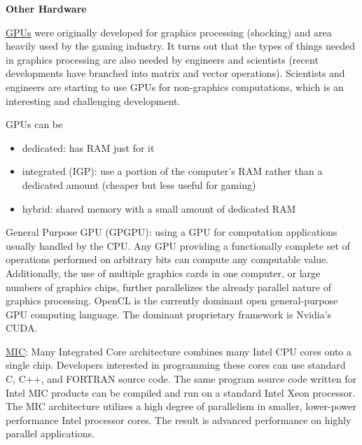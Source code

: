 \documentclass[12pt]{article}
\begin{document}
\vspace*{2em}
\noindent \textbf{Other Hardware}

\underline{GPUs} were originally developed for graphics processing (shocking) and area heavily used by the gaming industry. It turns out that the types of things needed in graphics processing are also needed by engineers and scientists (recent developments have branched into matrix and vector operations). Scientists and engineers are starting to use GPUs for non-graphics computations, which is an interesting and challenging development. 

GPUs can be 
\begin{itemize}
\item dedicated: has RAM just for it
\item integrated (IGP): use a portion of the computer's RAM rather than a dedicated amount (cheaper but less useful for gaming)
\item hybrid: shared memory with a small amount of dedicated RAM
\end{itemize}

General Purpose GPU (GPGPU): using a GPU for computation applications usually handled by the CPU. Any GPU providing a functionally complete set of operations performed on arbitrary bits can compute any computable value. Additionally, the use of multiple graphics cards in one computer, or large numbers of graphics chips, further parallelizes the already parallel nature of graphics processing. OpenCL is the currently dominant open general-purpose GPU computing language. The dominant proprietary framework is Nvidia's CUDA.

\vspace*{1em}
\underline{MIC}: Many Integrated Core architecture  combines many Intel CPU cores onto a single chip. Developers interested in programming these cores can use standard C, C++, and FORTRAN source code. The same program source code written for Intel MIC products can be compiled and run on a standard Intel Xeon processor. The MIC architecture utilizes a high degree of parallelism in smaller, lower-power performance Intel processor cores. The result is advanced performance on highly parallel applications.
\end{document}

